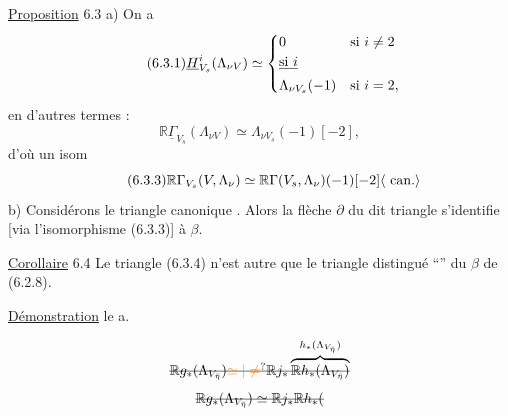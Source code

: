 \uline{Proposition} 6.3 a) On a
\[
\tag*{(6.3.1)}\underline{H}^i_{V_s}(\Lambda_{\nu V})\simeq\begin{cases}
0&\text{si }i\ne2\\
\deleted{\text{si }i}&\\
\Lambda_{\nu V_s}(-1)&\text{si }i=2,
\end{cases}
\]
en d'autres termes :
\[
\tag*{(6.3.2)}\mathbb{R}\underline\Gamma_{V_s}(\Lambda_{\nu V})\simeq\Lambda_{\nu V_s}(-1)[-2],
\]
d'où un isom
\[
\tag*{(6.3.3)}\mathbb{R}\Gamma_{V_s}(V,\Lambda_\nu)\simeq\mathbb{R}\Gamma(V_s,\Lambda_\nu)(-1)[-2]\inserted{\text{ can.}}
\]
b) Considérons le triangle canonique
.
Alors la flèche $\partial$ du dit triangle s'identifie [via l'isomorphisme (6.3.3)] à $\beta$. 

\uline{Corollaire} 6.4  Le triangle (6.3.4) n'est autre que le triangle distingué   ``{}'' du $\beta$ de (6.2.8).

\uline{Démonstration} le a.

\[
\deleted{\mathbb{R}g_*(\Lambda_{V_{\bar\eta}})\unsure{\simeq|\ne}\mathbb{R}j_*\overbrace{\mathbb{R}h_*(\Lambda_{V_{\bar\eta}})}^{h_*(\Lambda_{V_{\bar\eta}})}}
\]
\[
\deleted{\mathbb{R}g_*(\Lambda_{V_{\bar\eta}})\simeq\mathbb{R}j_*\mathbb{R}h_*(}
\]

